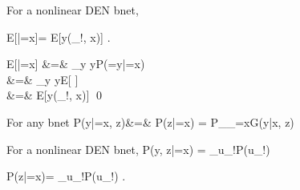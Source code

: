 \begin{claim}
For a nonlinear DEN bnet,

\beq
E[\rvy|\cald \rvx=x]=
E[y(\rvu_{!\rvx}, x)]
\;.
\eeq
\end{claim}
\proof

\beqa
E[\rvy|\cald \rvx=x]
&=&
\sum_{y}
yP(\rvy=y|\cald\rvx=x)
\\
&=&
\sum_{y}
yE[
\delta[y, y(u_{!\rvx},x)]]
\\
&=&
E[y(\rvu_{!\rvx}, x)]
\eeqa
\qed


For any bnet
\beqa
P(y|\cald\rvx=x, z)&=&
{P(z|\cald\rvx=x)}
=
P_{\cald_{\rvx=x}G}(y|x, z)
\eeqa

For a nonlinear DEN bnet,
\beq
P(y, z|\cald\rvx=x)
=
\sum_{u_{!\rvx}}P(u_{!\rvx})
\delta[y, y(u_{!\rvx},x)]
\delta[z, z(u_{!\rvx},x)]
\eeq

\beq
P(z|\cald\rvx=x)=
\sum_{u_{!\rvx}}P(u_{!\rvx})
\delta[z, z(u_{!\rvx},x)]
\;.
\eeq

